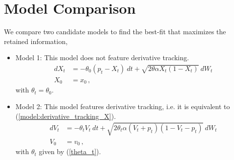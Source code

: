 \documentclass[11pt]{article}
\begin{document}
\section{Model Comparison} \label{Section_5}

We compare two candidate models to find the best-fit that maximizes the retained information,
\begin{itemize}
  \item Model 1: This model does not feature derivative tracking.
  \begin{align}
  dX_t &=  - \theta_0 (p_t-X_t) \  dt + \sqrt{2 \theta \alpha X_t (1-X_t)} \  dW_t   \nonumber \\ %
  X_0 & = x_0 \,, \label{M0}
 \end{align}
  with $\theta_t= \theta_0 $.

%  

  \item Model 2: This model features derivative tracking, i.e. it is equivalent to (\ref{model:derivative_tracking_X}).
  \begin{align}
  dV_t &=  - \theta_t V_t \  dt + \sqrt{2 \theta_t \alpha (V_t +p_t ) (1-V_t-p_t)} \  dW_t   \nonumber \\ %
  V_0 & = v_0 \,, \label{M2}
  \end{align}
  with $\theta_t$ given by (\ref{theta_t}).
\end{itemize}
\end{document}
